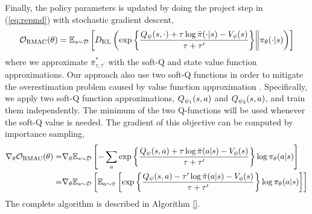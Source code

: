 Finally, the policy parameters is updated by doing the project step in (\ref{eq:repmd}) with stochastic gradient descent,
\begin{align*}
{\mathcal{O}}_{\text{RMAC}} (\theta) = \mathbb{E}_{s \sim {\mathcal{D}}} \left[ D_{\mathrm{KL}} \left( \exp\left\{ \frac{Q_{\psi}(s,\cdot) + \tau \log \bar{\pi}(\cdot|s) - V_{\phi}(s)}{\tau+\tau'} \right\} \middle\Vert \pi_{\theta}(\cdot |s) \right) \right]
\end{align*}
where we approximate $\bar{\pi}_{\tau,\tau^{\prime}}^*$ with the soft-Q and state value function approximations. 
Our approach also use two soft-Q functions in order to mitigate the overestimation problem caused by value function approximation \citep{haarnoja2018soft,fujimoto2018addressing}. Specifically, we apply two soft-Q function approximations, $Q_{\psi_1}(s,a)$ and $Q_{\psi_2}(s,a)$, and train them independently.  The minimum of the two Q-functions will be used whenever the soft-Q value is needed. 
The gradient of this objective can be computed by importance sampling, 
\begin{align*}
\nabla_\theta {\mathcal{O}}_{\text{RMAC}} (\theta) =& \nabla_\theta \mathbb{E}_{s \sim {\mathcal{D}}} \left[ -\sum_a \exp\left\{ \frac{Q_{\psi}(s,a) + \tau \log \bar{\pi}(a|s) - V_{\phi}(s)}{\tau+\tau'} \right\} \log \pi_{\theta}(a |s) \right] \\ 
= & \nabla_\theta \mathbb{E}_{s \sim {\mathcal{D}}} \left[ \mathbb{E}_{a\sim \bar{\pi}}\left[  \exp\left\{ \frac{Q_{\psi}(s,a) - \tau' \log \bar{\pi}(a|s) - V_{\phi}(s)}{\tau+\tau'} \right\} \log \pi_{\theta}(a |s) \right]   \right] 
\end{align*}
The complete algorithm is described in Algorithm \ref{}.















